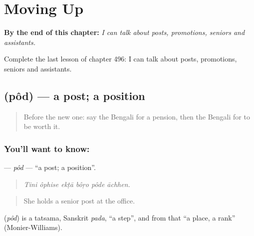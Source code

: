 
\chapter{Moving Up}
\label{ch:bn-moving-up}

\begin{chapteropening}
\textbf{By the end of this chapter:} \emph{I can talk about posts, promotions, seniors and assistants.}

Complete the last lesson of chapter 496: I can talk about posts, promotions, seniors and assistants.
\end{chapteropening}

\section[\texorpdfstring{\bn{পদ} (pôd)}{পদ (pôd)}]{ (pôd) — a post; a position}

\label{lesson:BN-C496-pod}



\begin{quote}
Before the new one: say the Bengali for a pension, then the Bengali for to be worth it.
\end{quote}

\subsection*{You'll want to know: }
\textbf{} — \emph{pôd} — \textquotedblleft{}a post; a position\textquotedblright{}.

\begin{quote}
     
\end{quote}

\begin{quote}
\emph{Tini ôphise ekṭā bôṛo pôde āchhen.}
\end{quote}

\begin{quote}
She holds a senior post at the office.
\end{quote}

\begin{cousinweb}
\textbf{} (\emph{pôd}) is a tatsama, Sanskrit \emph{pada}, \textquotedblleft{}a step\textquotedblright{}, and from that \textquotedblleft{}a place, a rank\textquotedblright{} (Monier-Williams).
\end{cousinweb}

